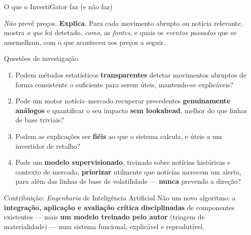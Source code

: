 \documentclass[aspectratio=169]{beamer}
\begin{document}
\begin{frame}{O que o InvestiGator faz (e não faz)}
\begin{block}{\emph{Não} prevê preços. \textbf{Explica}.}
Para cada movimento abrupto ou notícia relevante, mostra \emph{o que} foi detetado, \emph{como}, as \emph{fontes}, e quais os \emph{eventos passados} que se assemelham, com o que aconteceu aos preços a seguir.
\end{block}
\centering
{}
\end{frame}

\begin{frame}{Questões de investigação}
\begin{enumerate}
  \item[\textbf{RQ1}] Podem métodos estatísticos \textbf{transparentes} detetar movimentos abruptos de forma consistente o suficiente para serem úteis, mantendo-se explicáveis?
  \item[\textbf{RQ2}] Pode um motor notícia--mercado recuperar precedentes \textbf{genuinamente análogos} e quantificar o seu impacto \textbf{sem lookahead}, melhor do que linhas de base triviais?
  \item[\textbf{RQ3}] Podem as explicações ser \textbf{fiéis} ao que o sistema calcula, e úteis a um investidor de retalho?
  \item[\textbf{RQ4}] Pode um \textbf{modelo supervisionado}, treinado sobre notícias históricas e contexto de mercado, \textbf{priorizar} utilmente que notícias merecem um alerta, para além das linhas de base de volatilidade --- \textbf{nunca} prevendo a direção?
\end{enumerate}
\vfill
\begin{block}{Contribuição: \emph{Engenharia} de Inteligência Artificial}
Não um novo algoritmo: a \textbf{integração, aplicação e avaliação crítica disciplinadas} de componentes existentes --- mais \textbf{um modelo treinado pelo autor} (triagem de materialidade) --- num sistema funcional, explicável e reprodutível.
\end{block}
\end{frame}
\end{document}
